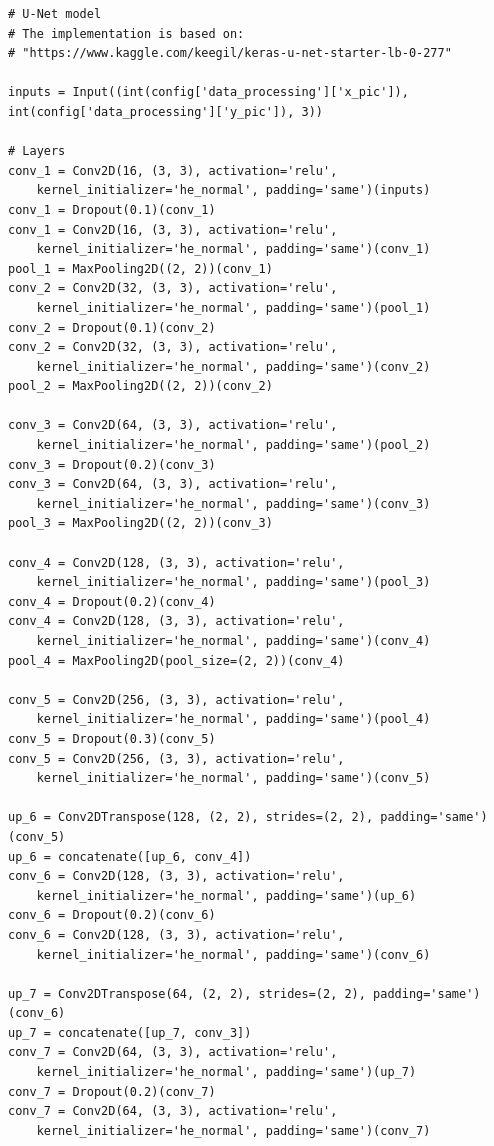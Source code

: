 \documentclass[USenglish]{ifimaster}  %
\begin{document}
\begin{verbatim}
# U-Net model
# The implementation is based on: 
# "https://www.kaggle.com/keegil/keras-u-net-starter-lb-0-277"

inputs = Input((int(config['data_processing']['x_pic']), 
int(config['data_processing']['y_pic']), 3))

# Layers
conv_1 = Conv2D(16, (3, 3), activation='relu',
    kernel_initializer='he_normal', padding='same')(inputs)
conv_1 = Dropout(0.1)(conv_1)
conv_1 = Conv2D(16, (3, 3), activation='relu', 
    kernel_initializer='he_normal', padding='same')(conv_1)
pool_1 = MaxPooling2D((2, 2))(conv_1)
conv_2 = Conv2D(32, (3, 3), activation='relu', 
    kernel_initializer='he_normal', padding='same')(pool_1)
conv_2 = Dropout(0.1)(conv_2)
conv_2 = Conv2D(32, (3, 3), activation='relu',
    kernel_initializer='he_normal', padding='same')(conv_2)
pool_2 = MaxPooling2D((2, 2))(conv_2)

conv_3 = Conv2D(64, (3, 3), activation='relu', 
    kernel_initializer='he_normal', padding='same')(pool_2)
conv_3 = Dropout(0.2)(conv_3)
conv_3 = Conv2D(64, (3, 3), activation='relu', 
    kernel_initializer='he_normal', padding='same')(conv_3)
pool_3 = MaxPooling2D((2, 2))(conv_3)

conv_4 = Conv2D(128, (3, 3), activation='relu', 
    kernel_initializer='he_normal', padding='same')(pool_3)
conv_4 = Dropout(0.2)(conv_4)
conv_4 = Conv2D(128, (3, 3), activation='relu', 
    kernel_initializer='he_normal', padding='same')(conv_4)
pool_4 = MaxPooling2D(pool_size=(2, 2))(conv_4)

conv_5 = Conv2D(256, (3, 3), activation='relu', 
    kernel_initializer='he_normal', padding='same')(pool_4)
conv_5 = Dropout(0.3)(conv_5)
conv_5 = Conv2D(256, (3, 3), activation='relu', 
    kernel_initializer='he_normal', padding='same')(conv_5)

up_6 = Conv2DTranspose(128, (2, 2), strides=(2, 2), padding='same')(conv_5)
up_6 = concatenate([up_6, conv_4])
conv_6 = Conv2D(128, (3, 3), activation='relu', 
    kernel_initializer='he_normal', padding='same')(up_6)
conv_6 = Dropout(0.2)(conv_6)
conv_6 = Conv2D(128, (3, 3), activation='relu', 
    kernel_initializer='he_normal', padding='same')(conv_6)

up_7 = Conv2DTranspose(64, (2, 2), strides=(2, 2), padding='same') (conv_6)
up_7 = concatenate([up_7, conv_3])
conv_7 = Conv2D(64, (3, 3), activation='relu', 
    kernel_initializer='he_normal', padding='same')(up_7)
conv_7 = Dropout(0.2)(conv_7)
conv_7 = Conv2D(64, (3, 3), activation='relu', 
    kernel_initializer='he_normal', padding='same')(conv_7)


\end{verbatim}
\end{document}
